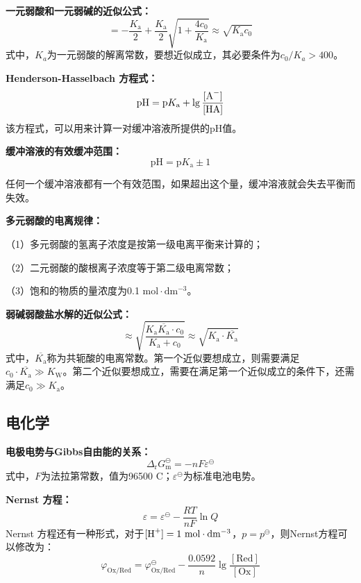 \documentclass[
  10pt,
  twoside,
  openany,
  b5paper, %
  colorscheme = basic, %
  xits = false,
]{qyxf-book}
\begin{document}
\textbf{一元弱酸和一元弱碱的近似公式：}
	\begin{equation*}
		[\ce{H+}] = -\frac{K_\mathrm{a}}{2}+\frac{K_\mathrm{a}}{2}\sqrt{1+\frac{4c_0}{K_\mathrm{a}}} \approx \sqrt{K_\mathrm{a}c_0}
	\end{equation*}
式中，$K_a$为一元弱酸的解离常数，要想近似成立，其必要条件为$c_0/K_a > 400$。

\textbf{Henderson-Hasselbach 方程式：}
	\begin{equation*}
		\mathrm{pH}  = \mathrm{p}K_\mathrm{a} + \lg \frac{[\ce{A-}]}{[\ce{HA}]}
	\end{equation*}
该方程式，可以用来计算一对缓冲溶液所提供的pH值。

\textbf{缓冲溶液的有效缓冲范围：}
	\begin{equation*}
		\mathrm{pH} = \mathrm{p}K_\mathrm{a} \pm 1
	\end{equation*}

任何一个缓冲溶液都有一个有效范围，如果超出这个量，缓冲溶液就会失去平衡而失效。

\textbf{多元弱酸的电离规律：}

（1）多元弱酸的氢离子浓度是按第一级电离平衡来计算的；

（2）二元弱酸的酸根离子浓度等于第二级电离常数；
 
（3）饱和的物质的量浓度为0.1 $\mathrm{mol \cdot dm^\mathrm{-3}}$。

\textbf{弱碱弱酸盐水解的近似公式：}
	\begin{equation*}
		[\ce{H+}] \approx \sqrt{\frac{K_\mathrm{a}\overline{K_\mathrm{a}}\cdot c_0}{K_\mathrm{a}+c_0}} \approx \sqrt{K_\mathrm{a} \cdot \overline{K_\mathrm{a}}}
	\end{equation*}
式中，$\overline{K_\mathrm{a}}$称为共轭酸的电离常数。第一个近似要想成立，则需要满足$c_0 \cdot \overline{K_\mathrm{a}} \gg K_\mathrm{W}$。第二个近似要想成立，需要在满足第一个近似成立的条件下，还需满足$c_0 \gg K_\mathrm{a}$。

\subsection{电化学}

\textbf{电极电势与Gibbs自由能的关系：}
	\begin{equation*}
		\Delta_\mathrm{r}G^\ominus_\mathrm{m} = -nF\varepsilon^\ominus
	\end{equation*}
式中，$F$为法拉第常数，值为96500 C；$\varepsilon^\ominus$为标准电池电势。

\textbf{Nernst 方程：}
	\begin{equation*}
		\varepsilon = \varepsilon^\ominus - \frac{RT}{nF} \ln Q
	\end{equation*}
Nernst 方程还有一种形式，对于$[\ce{H+}] = 1 \ \mathrm{mol \cdot dm^\mathrm{-3}}$，$p = p^\ominus$，则Nernst方程可以修改为：
	\begin{equation*}
		\varphi_\mathrm{Ox/Red}=\varphi^\ominus_\mathrm{Ox/Red} - \frac{0.0592}{n} \lg \frac{[\mathrm{Red}]}{[\mathrm{Ox}]}
	\end{equation*}
\end{document}
